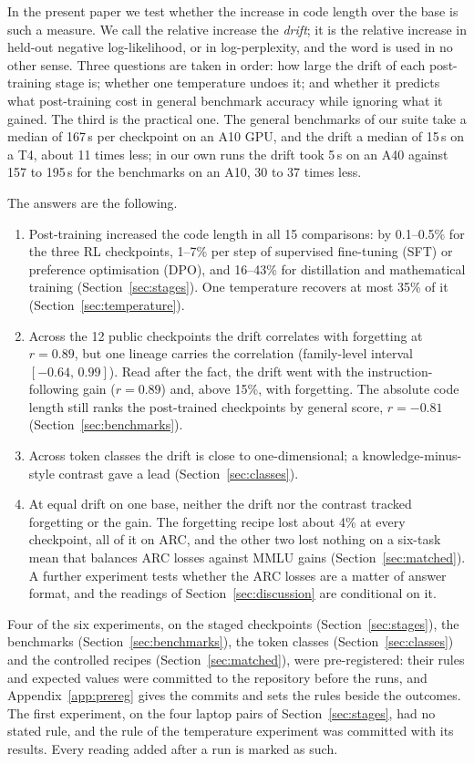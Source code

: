 \documentclass[11pt,a4paper]{article}
\theoremstyle{definition}
\begin{document}
In the present paper we test whether the increase in code length over the base is such a measure. We call the
relative increase the \emph{drift}; it is the relative increase in held-out negative log-likelihood, or in
log-perplexity, and the word is used in no other sense. Three questions are taken in order: how large the drift of
each post-training stage is; whether one temperature undoes it; and whether it predicts what post-training cost in
general benchmark accuracy while ignoring what it gained. The third is the practical one. The general benchmarks
of our suite take a median of 167\,s per checkpoint on an A10 GPU, and the drift a median of 15\,s on a T4, about
11 times less; in our own runs the drift took 5\,s on an A40 against 157 to 195\,s for the benchmarks on an A10,
30 to 37 times less.

The answers are the following.
\begin{enumerate}
\item Post-training increased the code length in all 15 comparisons: by 0.1--0.5\% for the three RL checkpoints,
1--7\% per step of supervised fine-tuning (SFT) or preference optimisation (DPO), and 16--43\% for distillation
and mathematical training (Section~\ref{sec:stages}). One temperature recovers at most 35\% of it
(Section~\ref{sec:temperature}).
\item Across the 12 public checkpoints the drift correlates with forgetting at $r=0.89$, but one lineage carries
the correlation (family-level interval $[-0.64,\,0.99]$). Read after the fact, the drift went with the
instruction-following gain ($r=0.89$) and, above 15\%, with forgetting. The absolute code length still ranks the
post-trained checkpoints by general score, $r=-0.81$ (Section~\ref{sec:benchmarks}).
\item Across token classes the drift is close to one-dimensional; a knowledge-minus-style contrast gave a lead
(Section~\ref{sec:classes}).
\item At equal drift on one base, neither the drift nor the contrast tracked forgetting or the gain. The forgetting
recipe lost about 4\% at every checkpoint, all of it on ARC, and the other two lost nothing on a six-task mean that
balances ARC losses against MMLU gains (Section~\ref{sec:matched}). A further experiment tests whether the ARC
losses are a matter of answer format, and the readings of Section~\ref{sec:discussion} are conditional on it.
\end{enumerate}
Four of the six experiments, on the staged checkpoints (Section~\ref{sec:stages}), the benchmarks
(Section~\ref{sec:benchmarks}), the token classes (Section~\ref{sec:classes}) and the controlled recipes
(Section~\ref{sec:matched}), were pre-registered: their rules and expected values were committed to the repository before
the runs, and Appendix~\ref{app:prereg} gives the commits and sets the rules beside the outcomes. The first
experiment, on the four laptop pairs of Section~\ref{sec:stages}, had no stated rule, and the rule of the temperature experiment was committed with its results. Every
reading added after a run is marked as such.
\end{document}
